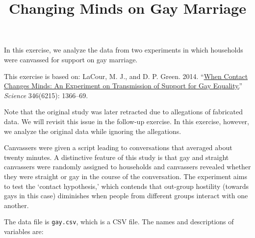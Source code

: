 \documentclass[]{article}
\title{Changing Minds on Gay Marriage}
\author{}
\date{}
\begin{document}
\maketitle


In this exercise, we analyze the data from two experiments in which
households were canvassed for support on gay marriage.

This exercise is based on: LaCour, M. J., and D. P. Green. 2014.
``\href{http://dx.doi.org/10.1126/science.1256151}{When Contact Changes
Minds: An Experiment on Transmission of Support for Gay Equality.}''
\emph{Science} 346(6215): 1366--69.

Note that the original study was later retracted due to allegations of
fabricated data. We will revisit this issue in the follow-up exercise.
In this exercise, however, we analyze the original data while ignoring
the allegations.

Canvassers were given a script leading to conversations that averaged
about twenty minutes. A distinctive feature of this study is that gay
and straight canvassers were randomly assigned to households and
canvassers revealed whether they were straight or gay in the course of
the conversation. The experiment aims to test the `contact hypothesis,'
which contends that out-group hostility (towards gays in this case)
diminishes when people from different groups interact with one another.

The data file is \texttt{gay.csv}, which is a CSV file. The names and
descriptions of variables are:
\end{document}
